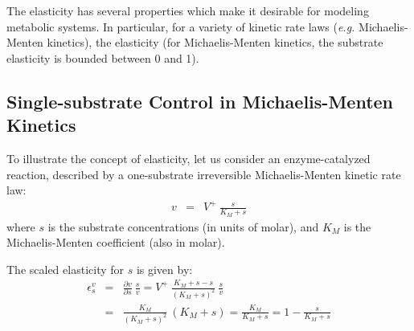 \documentclass[12pt,a4paper]{article}
\begin{document}
The elasticity has several properties which make it desirable for modeling metabolic systems. In particular, for a variety of kinetic rate laws (\textit{e.g.} Michaelis-Menten kinetics), the elasticity (for Michaelis-Menten kinetics, the substrate elasticity is bounded between 0 and 1). 

\subsection{Single-substrate Control in Michaelis-Menten Kinetics}
To illustrate the concept of elasticity, let us consider an enzyme-catalyzed reaction, described by a one-substrate irreversible Michaelis-Menten kinetic rate law:
\begin{eqnarray}
    v &=& V^+ ~ \frac{s}{K_M + s}
\end{eqnarray}
where $s$ is the substrate concentrations (in units of molar), and $K_M$ is the Michaelis-Menten coefficient (also in molar).

\begin{center}
\end{center}

The scaled elasticity for $s$ is given by:
\begin{eqnarray}
    \epsilon_s^v &=& \frac{\partial v}{\partial s} ~ \frac{s}{v} = V^+ ~ \frac{K_M + s - s}{(K_M + s)^2} ~ \frac{s}{v} \nonumber \\
    &=& \frac{K_M}{(K_M + s)^2} ~ (K_M + s) = \frac{K_M}{K_M + s} = 1 - \frac{s}{K_M + s}\label{eq:eps_s_v_irr}
\end{eqnarray}

\begin{center}
\end{center}
\end{document}
